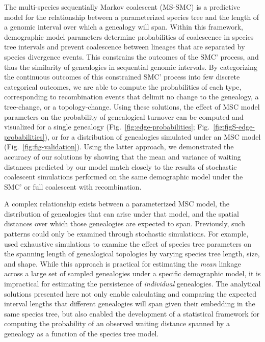 \documentclass[11pt]{article}
\begin{document}
The multi-species sequentially Markov coalescent (MS-SMC) is
a predictive model for the relationship between a parameterized species
tree and the length of a genomic interval over which a genealogy will 
span.
Within this framework, demographic model parameters determine
probabilities of coalescence
in species tree intervals and prevent coalescence between lineages that
are separated by species divergence events. 
This constrains the outcomes of the SMC' process, 
and thus the similarity of genealogies in sequential genomic intervals.
By categorizing the continuous outcomes of this constrained SMC' process into 
few discrete categorical outcomes, we are able to compute the probabilities of 
each type, corresponding to recombination events that delimit no change to the
genealogy, a tree-change, or a topology-change.
Using these solutions, the effect of MSC model parameters on the probability
of genealogical turnover can be computed and visualized for a single genealogy
(Fig.~\ref{fig:edge-probabilities}; Fig.~\ref{fig:figS-edge-probabilities}),
or for a distribution of genealogies simulated under an MSC model
(Fig.~\ref{fig:fig-validation}).
Using the latter approach, we demonstrated the accuracy of our solutions by
showing that the mean and variance of waiting distances predicted by our model
match closely to the results of stochastic coalescent simulations performed
on the same demographic model under the SMC' or full coalescent with 
recombination.

A complex relationship exists between a parameterized MSC model, 
the distribution of genealogies that can arise under that model, and the 
spatial distances over which those genealogies are expected to span.
Previously, such patterns could only be examined through stochastic simulations. 
For example, \cite{mckenzie_multispecies_2020} used exhaustive simulations to
examine the effect of species tree parameters on 
the spanning length of genealogical topologies
by varying species tree length, size, and shape. 
While this approach is practical for estimating the \emph{mean} linkage across
a large set of sampled genealogies under a specific demographic model, it is
impractical for estimating the persistence of \emph{individual} genealogies. 
The analytical solutions presented here not only enable 
calculating and comparing the expected interval lengths that different 
genealogies will span given their embedding in the same species tree, 
but also enabled the development of a statistical framework for computing 
the probability of an observed waiting distance spanned by a genealogy 
as a function of the species tree model.
\end{document}
